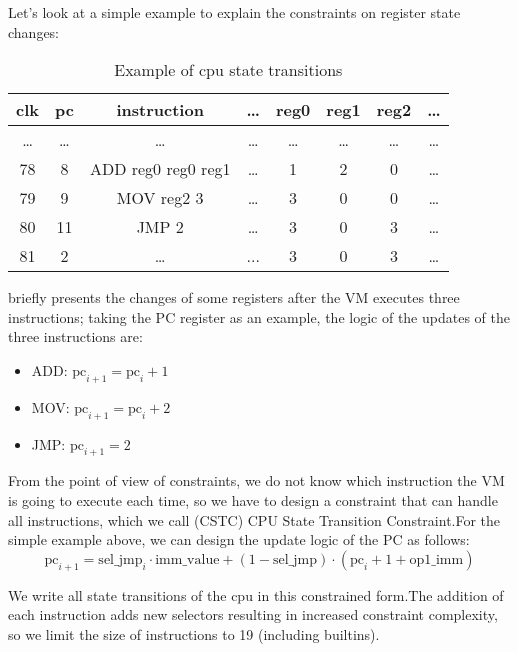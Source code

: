 Let's look at a simple example to explain the constraints on register state changes:
\begin{table}[!ht]
    \centering
    \begin{tabular}{|c|c|c|c|c|c|c|c|}
        \hline
        \rowcolor{gray} clk & pc    & instruction        & \dots & reg0  & reg1  & reg2  & \dots \\
        \hline
        \dots               & \dots & \dots              & \dots & \dots & \dots & \dots & \dots \\
        \hline
        78                  & 8     & ADD reg0 reg0 reg1 & \dots & 1     & 2     & 0     & \dots \\
        \hline
        79                  & 9     & MOV reg2 3         & \dots & 3     & 0     & 0     & \dots \\
        \hline
        80                  & 11    & JMP 2              & \dots & 3     & 0     & 3     & \dots \\
        \hline
        81                  & 2     & \dots              & ...   & 3     & 0     & 3     & \dots \\
        \hline
    \end{tabular}
    \caption{Example of cpu state transitions}
    \label{table:example-cpu-state-transitions}
\end{table}

 briefly presents the changes of some registers after the VM executes three
instructions; taking the PC register as an example, the logic of the updates of the three instructions are:
\begin{itemize}
    \item ADD: $\mathrm{pc}_{i+1} = \mathrm{pc}_i + 1$
    \item MOV: $\mathrm{pc}_{i+1} = \mathrm{pc}_i + 2$
    \item JMP: $\mathrm{pc}_{i+1} = 2$
\end{itemize}

From the point of view of constraints, we do not know which instruction the VM is going to execute each time, so we have to
design a constraint that can handle all instructions, which we call (CSTC) CPU State Transition Constraint.For the simple
example above, we can design the update logic of the PC as follows:
\[ \mathrm{pc}_{i+1} = \mathrm{sel\_jmp}_i \cdot \mathrm{imm\_value} + (1 - \mathrm{sel\_jmp}) \cdot (\mathrm{pc}_i + 1 + \mathrm{op1\_imm}) \]

We write all state transitions of the cpu in this constrained form.The addition of each instruction adds new selectors resulting
in increased constraint complexity, so we limit the size of instructions to 19 (including builtins).

